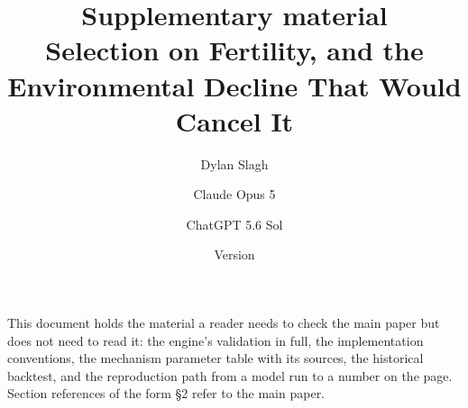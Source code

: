 \documentclass[11pt]{article}
\title{\textbf{Supplementary material}\\[0.35em]
\large Selection on Fertility, and the Environmental Decline That Would Cancel It}
\author{Dylan Slagh \and Claude Opus 5 \and ChatGPT 5.6 Sol}
\date{Version \PaperVersion{} \quad\textbullet\quad \PaperDate{}}
\begin{document}
\maketitle

This document holds the material a reader needs to check the main paper but does
not need to read it: the engine's validation in full, the implementation
conventions, the mechanism parameter table with
its sources, the historical backtest, and the reproduction path from a model run
to a number on the page. Section references of the form \S2 refer to the main
paper.

\tableofcontents






{\small


}
\end{document}
